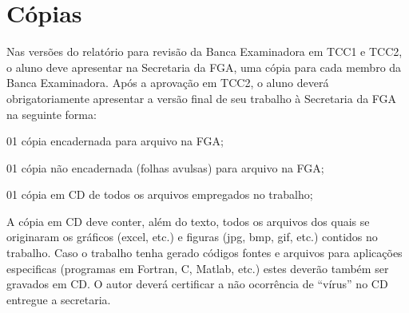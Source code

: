 \section{Cópias}
Nas versões do relatório para revisão da Banca Examinadora em TCC1 e TCC2,
o aluno deve apresentar na Secretaria da FGA, uma cópia para cada membro da
Banca Examinadora.
Após a aprovação em TCC2, o aluno deverá obrigatoriamente apresentar a
versão final de seu trabalho à Secretaria da FGA na seguinte forma:
\begin{description}
\item 01 cópia encadernada para arquivo na FGA;
\item 01 cópia não encadernada (folhas avulsas) para arquivo na FGA;
\item 01 cópia em CD de todos os arquivos empregados no trabalho;
\end{description}
A cópia em CD deve conter, além do texto, todos os arquivos dos quais se
originaram os gráficos (excel, etc.) e figuras (jpg, bmp, gif, etc.)
contidos no trabalho. Caso o trabalho tenha gerado códigos fontes e
arquivos para aplicações especificas (programas em Fortran, C, Matlab,
etc.) estes deverão também ser gravados em CD.
O autor deverá certificar a não ocorrência de “vírus” no CD entregue a
secretaria. 